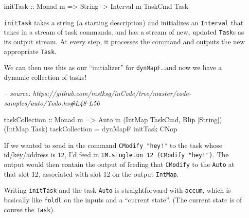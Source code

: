 \documentclass[]{article}
\newenvironment{Shaded}{}{}
\newcommand{\CommentTok}[1]{\textcolor[rgb]{0.38,0.63,0.69}{\textit{#1}}}
\newcommand{\DataTypeTok}[1]{\textcolor[rgb]{0.56,0.13,0.00}{#1}}
\newcommand{\FunctionTok}[1]{\textcolor[rgb]{0.02,0.16,0.49}{#1}}
\newcommand{\NormalTok}[1]{#1}
\newcommand{\OtherTok}[1]{\textcolor[rgb]{0.00,0.44,0.13}{#1}}
\begin{document}
\begin{Shaded}
\begin{Highlighting}[]
\OtherTok{initTask ::} \DataTypeTok{Monad}\NormalTok{ m }\OtherTok{=>} \DataTypeTok{String} \OtherTok{->} \DataTypeTok{Interval}\NormalTok{ m }\DataTypeTok{TaskCmd} \DataTypeTok{Task}
\end{Highlighting}
\end{Shaded}

\texttt{initTask} takes a string (a starting description) and initializes an
\texttt{Interval} that takes in a stream of task commands, and has a stream of
new, updated \texttt{Task}s as its output stream. At every step, it processes
the command and outputs the new appropriate \texttt{Task}.

We can then use this as our ``initializer'' for \texttt{dynMapF}\ldots{}and now
we have a dynamic collection of tasks!

\begin{Shaded}
\begin{Highlighting}[]
\CommentTok{-- source: https://github.com/mstksg/inCode/tree/master/code-samples/auto/Todo.hs#L48-L50}

\OtherTok{taskCollection ::} \DataTypeTok{Monad}\NormalTok{ m}
               \OtherTok{=>} \DataTypeTok{Auto}\NormalTok{ m (}\DataTypeTok{IntMap} \DataTypeTok{TaskCmd}\NormalTok{, }\DataTypeTok{Blip}\NormalTok{ [}\DataTypeTok{String}\NormalTok{]) (}\DataTypeTok{IntMap} \DataTypeTok{Task}\NormalTok{)}
\NormalTok{taskCollection }\FunctionTok{=}\NormalTok{ dynMapF initTask }\DataTypeTok{CNop}
\end{Highlighting}
\end{Shaded}

If we wanted to send in the command \texttt{CModify\ "hey!"} to the task whose
id/key/address is \texttt{12}, I'd feed in
\texttt{IM.singleton\ 12\ (CModify\ "hey!")}. The output would then contain the
output of feeding that \texttt{CModify} to the \texttt{Auto} at that slot 12,
associated with slot 12 on the output \texttt{IntMap}.

Writing \texttt{initTask} and the task \texttt{Auto} is straightforward with
\texttt{accum}, which is basically like \texttt{foldl} on the inputs and a
``current state''. (The current state is of course the \texttt{Task}).
\end{document}
